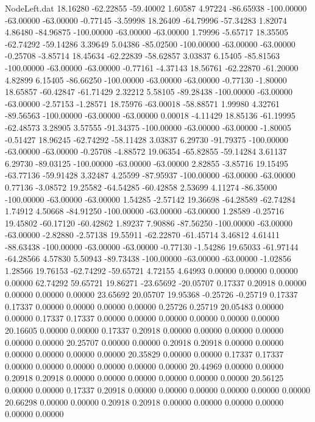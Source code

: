 \begin{filecontents}{NodeLeft.dat}
  18.16280  -62.22855  -59.40002     1.60587    4.97224  -86.65938 -100.00000  -63.00000  -63.00000   -0.77145   -3.59998
  18.26409  -64.79996  -57.34283     1.82074    4.86480  -84.96875 -100.00000  -63.00000  -63.00000    1.79996   -5.65717
  18.35505  -62.74292  -59.14286     3.39649    5.04386  -85.02500 -100.00000  -63.00000  -63.00000   -0.25708   -3.85714
  18.45634  -62.22839  -58.62857     3.03837    6.15405  -85.81563 -100.00000  -63.00000  -63.00000   -0.77161   -4.37143
  18.56761  -62.22870  -61.20000     4.82899    6.15405  -86.66250 -100.00000  -63.00000  -63.00000   -0.77130   -1.80000
  18.65857  -60.42847  -61.71429     2.32212    5.58105  -89.28438 -100.00000  -63.00000  -63.00000   -2.57153   -1.28571
  18.75976  -63.00018  -58.88571     1.99980    4.32761  -89.56563 -100.00000  -63.00000  -63.00000    0.00018   -4.11429
  18.85136  -61.19995  -62.48573     3.28905    3.57555  -91.34375 -100.00000  -63.00000  -63.00000   -1.80005   -0.51427
  18.96245  -62.74292  -58.11428     3.03837    6.29730  -91.79375 -100.00000  -63.00000  -63.00000   -0.25708   -4.88572
  19.06354  -65.82855  -59.14284     3.61137    6.29730  -89.03125 -100.00000  -63.00000  -63.00000    2.82855   -3.85716
  19.15495  -63.77136  -59.91428     3.32487    4.25599  -87.95937 -100.00000  -63.00000  -63.00000    0.77136   -3.08572
  19.25582  -64.54285  -60.42858     2.53699    4.11274  -86.35000 -100.00000  -63.00000  -63.00000    1.54285   -2.57142
  19.36698  -64.28589  -62.74284     1.74912    4.50668  -84.91250 -100.00000  -63.00000  -63.00000    1.28589   -0.25716
  19.45802  -60.17120  -60.42862     1.89237    7.90886  -87.56250 -100.00000  -63.00000  -63.00000   -2.82880   -2.57138
  19.55911  -62.22870  -61.45714     3.46812    4.61411  -88.63438 -100.00000  -63.00000  -63.00000   -0.77130   -1.54286
  19.65033  -61.97144  -64.28566     4.57830    5.50943  -89.73438 -100.00000  -63.00000  -63.00000   -1.02856    1.28566
  19.76153  -62.74292  -59.65721     4.72155    4.64993    0.00000    0.00000    0.00000    0.00000   62.74292   59.65721
  19.86271  -23.65692  -20.05707     0.17337    0.20918    0.00000    0.00000    0.00000    0.00000   23.65692   20.05707
  19.95368   -0.25726   -0.25719     0.17337    0.17337    0.00000    0.00000    0.00000    0.00000    0.25726    0.25719
  20.05483    0.00000    0.00000     0.17337    0.17337    0.00000    0.00000    0.00000    0.00000    0.00000    0.00000
  20.16605    0.00000    0.00000     0.17337    0.20918    0.00000    0.00000    0.00000    0.00000    0.00000    0.00000
  20.25707    0.00000    0.00000     0.20918    0.20918    0.00000    0.00000    0.00000    0.00000    0.00000    0.00000
  20.35829    0.00000    0.00000     0.17337    0.17337    0.00000    0.00000    0.00000    0.00000    0.00000    0.00000
  20.44969    0.00000    0.00000     0.20918    0.20918    0.00000    0.00000    0.00000    0.00000    0.00000    0.00000
  20.56125    0.00000    0.00000     0.17337    0.20918    0.00000    0.00000    0.00000    0.00000    0.00000    0.00000
  20.66298    0.00000    0.00000     0.20918    0.20918    0.00000    0.00000    0.00000    0.00000    0.00000    0.00000
\end{filecontents}
